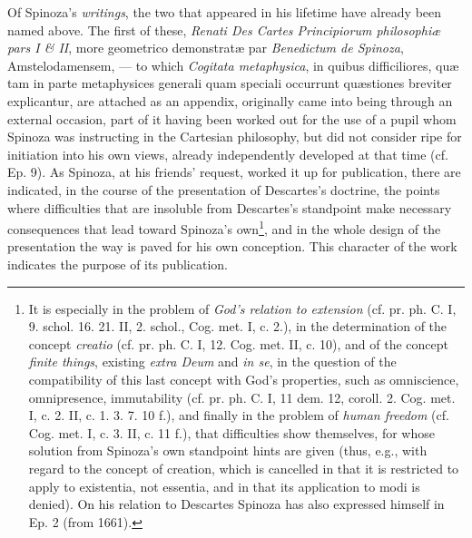 \documentclass[12pt,a4paper,openany]{book}
\newcommand{\opage}[1]{\marginnote{\footnotesize\textit{[#1]}}}
\begin{document}
Of Spinoza's \emph{writings}, the two that appeared in his lifetime have
already been named above. The first of these, \emph{Renati Des Cartes
Principiorum philosophiæ pars I \& II}, more geometrico demonstratæ par
\emph{Benedictum de Spinoza}, Amstelodamensem, --- to which
\emph{Cogitata metaphysica}, in quibus difficiliores, quæ tam in parte
metaphysices generali quam speciali occurrunt quæstiones breviter
explicantur, are attached as an appendix, originally came into being
through an external occasion, part of it having been worked out for the
use of a pupil whom Spinoza was instructing in the Cartesian philosophy,
but did not consider ripe for initiation into his own views, already
independently developed at that time (cf. Ep. 9). As Spinoza, at his
friends' request, worked it up for publication, there are indicated, in
the course of the presentation of Descartes's doctrine, the points where
difficulties that are insoluble from Descartes's standpoint make
necessary consequences that lead toward Spinoza's own\footnote{It is
especially in the problem of \emph{God's relation to extension} (cf. pr.
ph. C. I, 9. schol. 16. 21. II, 2. schol., Cog. met. I, c. 2.), in the
determination of the concept \emph{creatio} (cf. pr. ph. C. I, 12. Cog.
met. II, c. 10), and of the concept \emph{finite things}, existing
\emph{extra Deum} and \emph{in se}, in the question of the compatibility
of this last concept with God's properties, such as omniscience,
omnipresence, immutability (cf. pr. ph. C. I, 11 dem. 12, coroll. 2.
Cog. met. I, c. 2. II, c. 1. 3. 7. 10 f.), and finally in the problem of
\emph{human freedom} (cf. Cog. met. I, c. 3. II, c. 11 f.), that
difficulties show themselves, for whose solution from Spinoza's own
standpoint hints are given (thus, e.g., with regard to the concept of
creation, which is cancelled in that it is restricted to apply to
existentia, not essentia, and in that its application to modi is
denied). On his relation to Descartes Spinoza has also expressed himself
in Ep. 2 (from 1661).}, and in the whole design of the presentation the
way is paved
\opage{35}\setcounter{footnote}{0}for his own conception. This character of
the work indicates the purpose of its publication.
\end{document}
